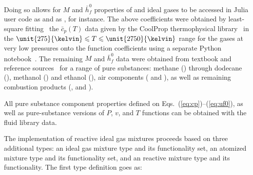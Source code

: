     Doing so allows for $M$ and $\bar{h}_f^0$ properties of  and  ideal gases to be accessed in Julia user code as  and as , for  instance.  The
    above    coefficients  were  obtained  by  least-square  fitting~\cite{2007-PressWH+FlanneryBP-Cambridge}  the  $\bar{c}_p(T)$  data  given  by   the   CoolProp   thermophysical
    library~\cite{2014-BellIH+VincentL-IndEngChemR} in the $\unit{275}{\kelvin} \leqslant T \leqslant \unit{2750}{\kelvin}$ range for the gases at  very  low  pressures  onto  the  
    function coefficients using a separate Python~\cite{1995-vanRossumG-CWI} notebook~\cite{2019-Jupyter-www}. The remaining  $M$  and  $\bar{h}_f^0$  data  were  obtained  from  textbook  and
    reference sources~\cite{2013-CengelYA+BolesMA-AMGH, 1985-WylenG-Wiley, 2006-LideDR-CRC} for a range  of  pure  substances:  methane  ()  through  dodecane  (),  methanol
    () and ethanol (), air components ( and ), as well as remaining combustion products (, and ).

    All pure substance component properties defined on Eqs.~(\ref{eq:cp})--(\ref{eq:uf0}), as well as pure-substance versions of
    $P$, $v$, and $T$ functions can be obtained with the  fluid library data.

    The implementation of reactive ideal gas mixtures proceeds based on  three  additional  types:  an    ideal  gas
    mixture type and its functionality set, an  atomized mixture type and its functionality set, and an  
    reactive mixture type and its functionality. The first type definition goes as:



